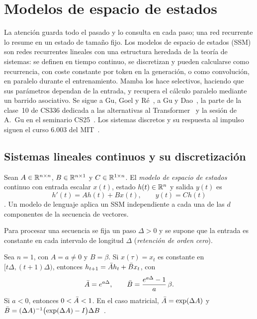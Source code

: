 \chapter{Modelos de espacio de estados}
\label{tema:5}

La atención guarda todo el pasado y lo consulta en cada paso; una red recurrente lo resume en un estado de tamaño fijo. Los modelos de espacio de estados (SSM) son redes recurrentes lineales con una estructura heredada de la teoría de sistemas: se definen en tiempo continuo, se discretizan y pueden calcularse como recurrencia, con coste constante por token en la generación, o como convolución, en paralelo durante el entrenamiento. Mamba los hace selectivos, haciendo que sus parámetros dependan de la entrada, y recupera el cálculo paralelo mediante un barrido asociativo. Se sigue a Gu, Goel y Ré~\cite[§2]{s4}, a Gu y Dao~\cite[§2 y §3]{mamba}, la parte de la clase~10 de CS336 dedicada a las alternativas al Transformer~\cite{cs336} y la sesión de A.~Gu en el seminario CS25~\cite{cs25}. Los sistemas discretos y su respuesta al impulso siguen el curso 6.003 del MIT~\cite{mit6003}.

\section{Sistemas lineales continuos y su discretización}

\begin{definicion}\label{def:ssm}
Sean $A\in\mathbb{R}^{n\times n}$, $B\in\mathbb{R}^{n\times 1}$ y $C\in\mathbb{R}^{1\times n}$. El \emph{modelo de espacio de estados} continuo con entrada escalar $x(t)$, estado $h(t)\in\mathbb{R}^{n}$ y salida $y(t)$ es
\[
h'(t)=Ah(t)+Bx(t),\qquad y(t)=Ch(t)
\]
\cite[ecs.~1a y~1b]{mamba}. Un modelo de lenguaje aplica un SSM independiente a cada una de las $d$ componentes de la secuencia de vectores.
\end{definicion}

Para procesar una secuencia se fija un paso $\Delta>0$ y se supone que la entrada es constante en cada intervalo de longitud $\Delta$ (\emph{retención de orden cero}).

\begin{proposicion}\label{prop:zoh}
Sea $n=1$, con $A=a\ne 0$ y $B=\beta$. Si $x(\tau)=x_t$ es constante en $[t\Delta,(t+1)\Delta)$, entonces $h_{t+1}=\bar{A} h_t+\bar{B} x_t$, con
\[
\bar{A}=e^{a\Delta},\qquad \bar{B}=\frac{e^{a\Delta}-1}{a}\,\beta .
\]
Si $a<0$, entonces $0<\bar{A}<1$. En el caso matricial, $\bar{A}=\exp(\Delta A)$ y $\bar{B}=(\Delta A)^{-1}\bigl(\exp(\Delta A)-I\bigr)\Delta B$~\cite[ec.~4]{mamba}.
\end{proposicion}

